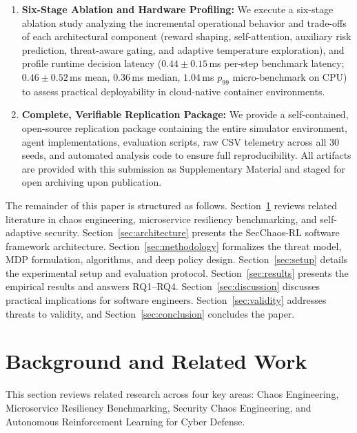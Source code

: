 \documentclass[ASNA,twocolumn]{USG}
\begin{document}
\begin{enumerate}
    \item \textbf{Six-Stage Ablation and Hardware Profiling:} We execute a six-stage ablation study analyzing the incremental operational behavior and trade-offs of each architectural component (reward shaping, self-attention, auxiliary risk prediction, threat-aware gating, and adaptive temperature exploration), and profile runtime decision latency ($0.44 \pm 0.15$\,ms per-step benchmark latency; $0.46 \pm 0.52$\,ms mean, $0.36$\,ms median, $1.04$\,ms $p_{99}$ micro-benchmark on CPU) to assess practical deployability in cloud-native container environments.
    \item \textbf{Complete, Verifiable Replication Package:} We provide a self-contained, open-source replication package containing the entire simulator environment, agent implementations, evaluation scripts, raw CSV telemetry across all 30 seeds, and automated analysis code to ensure full reproducibility. All artifacts are provided with this submission as Supplementary Material and staged for open archiving upon publication.
\end{enumerate}

The remainder of this paper is structured as follows. Section~\ref{sec:related_work} reviews related literature in chaos engineering, microservice resiliency benchmarking, and self-adaptive security. Section~\ref{sec:architecture} presents the SecChaos-RL software framework architecture. Section~\ref{sec:methodology} formalizes the threat model, MDP formulation, algorithms, and deep policy design. Section~\ref{sec:setup} details the experimental setup and evaluation protocol. Section~\ref{sec:results} presents the empirical results and answers RQ1–RQ4. Section~\ref{sec:discussion} discusses practical implications for software engineers. Section~\ref{sec:validity} addresses threats to validity, and Section~\ref{sec:conclusion} concludes the paper.

\section{Background and Related Work}
\label{sec:related_work}

This section reviews related research across four key areas: Chaos Engineering, Microservice Resiliency Benchmarking, Security Chaos Engineering, and Autonomous Reinforcement Learning for Cyber Defense.
\end{document}
